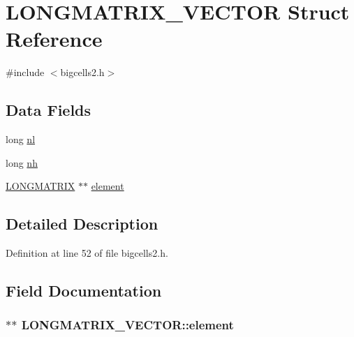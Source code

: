 \hypertarget{struct_l_o_n_g_m_a_t_r_i_x___v_e_c_t_o_r}{\section{L\-O\-N\-G\-M\-A\-T\-R\-I\-X\-\_\-\-V\-E\-C\-T\-O\-R Struct Reference}
\label{struct_l_o_n_g_m_a_t_r_i_x___v_e_c_t_o_r}
}


{\ttfamily \#include $<$bigcells2.\-h$>$}

\subsection*{Data Fields}
\begin{DoxyCompactItemize}
\item 
long \hyperlink{struct_l_o_n_g_m_a_t_r_i_x___v_e_c_t_o_r_a465020e51cc8a7ea86bbb098ea2bbba9}{nl}
\item 
long \hyperlink{struct_l_o_n_g_m_a_t_r_i_x___v_e_c_t_o_r_a47a229640d2bcb1b679b21c154b13364}{nh}
\item 
\hyperlink{struct_l_o_n_g_m_a_t_r_i_x}{L\-O\-N\-G\-M\-A\-T\-R\-I\-X} $\ast$$\ast$ \hyperlink{struct_l_o_n_g_m_a_t_r_i_x___v_e_c_t_o_r_ab23e29f0a4bb425e51e396b82565d61e}{element}
\end{DoxyCompactItemize}


\subsection{Detailed Description}


Definition at line 52 of file bigcells2.\-h.



\subsection{Field Documentation}
\hypertarget{struct_l_o_n_g_m_a_t_r_i_x___v_e_c_t_o_r_ab23e29f0a4bb425e51e396b82565d61e}{
\subsubsection[{element}]{$\ast$$\ast$ L\-O\-N\-G\-M\-A\-T\-R\-I\-X\-\_\-\-V\-E\-C\-T\-O\-R\-::element}}\label{struct_l_o_n_g_m_a_t_r_i_x___v_e_c_t_o_r_ab23e29f0a4bb425e51e396b82565d61e}


